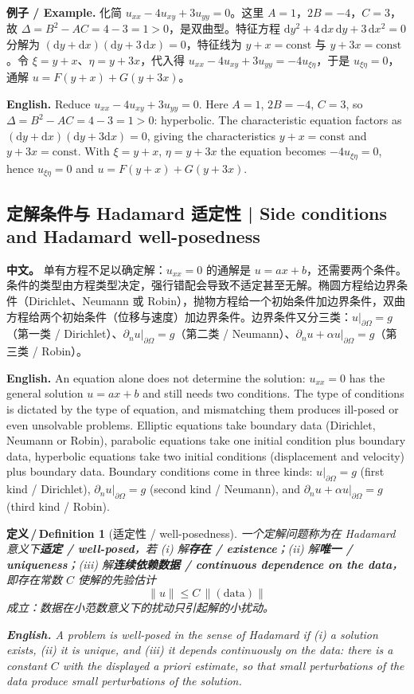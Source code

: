 \documentclass[UTF8,11pt,a4paper]{ctexart}
\newcommand{\APS}[2]{\par\noindent\textbf{中文。} #1\par\noindent\textbf{English.} #2\par\smallskip}
\newcommand{\EN}[1]{\par\noindent \textbf{English.} #1\par}
\newcommand{\EX}[2]{\par\noindent \textbf{例子 / Example.} #1\par\EN{#2}}
\newtheorem{definition}{定义\,/\,Definition}[section]
\newcommand{\dd}{\mathrm{d}}
\newcommand{\pdn}{\partial_n}
\begin{document}
\EX{化简 $u_{xx}-4u_{xy}+3u_{yy}=0$。这里 $A=1$，$2B=-4$，$C=3$，故 $\Delta=B^2-AC=4-3=1>0$，是双曲型。特征方程 $\dd y^2+4\,\dd x\,\dd y+3\,\dd x^2=0$ 分解为 $(\dd y+\dd x)(\dd y+3\,\dd x)=0$，特征线为 $y+x=\mathrm{const}$ 与 $y+3x=\mathrm{const}$。令 $\xi=y+x$、$\eta=y+3x$，代入得 $u_{xx}-4u_{xy}+3u_{yy}=-4u_{\xi\eta}$，于是 $u_{\xi\eta}=0$，通解 $u=F(y+x)+G(y+3x)$。}{Reduce $u_{xx}-4u_{xy}+3u_{yy}=0$. Here $A=1$, $2B=-4$, $C=3$, so $\Delta=B^2-AC=4-3=1>0$: hyperbolic. The characteristic equation factors as $(\dd y+\dd x)(\dd y+3\dd x)=0$, giving the characteristics $y+x=\mathrm{const}$ and $y+3x=\mathrm{const}$. With $\xi=y+x$, $\eta=y+3x$ the equation becomes $-4u_{\xi\eta}=0$, hence $u_{\xi\eta}=0$ and $u=F(y+x)+G(y+3x)$.}

\subsection{定解条件与 Hadamard 适定性 | Side conditions and Hadamard well-posedness}
\APS{单有方程不足以确定解：$u_{xx}=0$ 的通解是 $u=ax+b$，还需要两个条件。条件的类型由方程类型决定，强行错配会导致不适定甚至无解。椭圆方程给边界条件（Dirichlet、Neumann 或 Robin），抛物方程给一个初始条件加边界条件，双曲方程给两个初始条件（位移与速度）加边界条件。边界条件又分三类：$u|_{\partial\Omega}=g$（第一类 / Dirichlet）、$\pdn u|_{\partial\Omega}=g$（第二类 / Neumann）、$\pdn u+\alpha u|_{\partial\Omega}=g$（第三类 / Robin）。}{An equation alone does not determine the solution: $u_{xx}=0$ has the general solution $u=ax+b$ and still needs two conditions. The type of conditions is dictated by the type of equation, and mismatching them produces ill-posed or even unsolvable problems. Elliptic equations take boundary data (Dirichlet, Neumann or Robin), parabolic equations take one initial condition plus boundary data, hyperbolic equations take two initial conditions (displacement and velocity) plus boundary data. Boundary conditions come in three kinds: $u|_{\partial\Omega}=g$ (first kind / Dirichlet), $\pdn u|_{\partial\Omega}=g$ (second kind / Neumann), and $\pdn u+\alpha u|_{\partial\Omega}=g$ (third kind / Robin).}

\begin{definition}[适定性 / well-posedness]\label{def:wp}
一个定解问题称为在 Hadamard 意义下\textbf{适定 / well-posed}，若 (i) 解\textbf{存在 / existence}；(ii) 解\textbf{唯一 / uniqueness}；(iii) 解\textbf{连续依赖数据 / continuous dependence on the data}，即存在常数 $C$ 使解的先验估计
\[
\|u\|\le C\,\|(\text{data})\|
\]
成立：数据在小范数意义下的扰动只引起解的小扰动。
\EN{A problem is well-posed in the sense of Hadamard if (i) a solution exists, (ii) it is unique, and (iii) it depends continuously on the data: there is a constant $C$ with the displayed a priori estimate, so that small perturbations of the data produce small perturbations of the solution.}
\end{definition}
\end{document}
